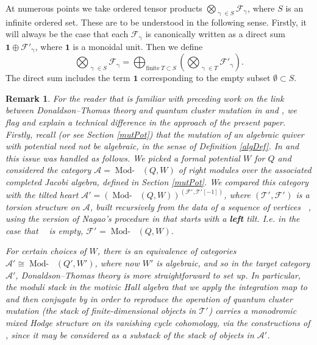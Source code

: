 \documentclass[a4paper,10pt]{amsart}
\newtheorem{remark}[theorem]{Remark}
\renewcommand{\gamma}{\upgamma}
\DeclareMathOperator{\Tmod}{Mod-}
\newcommand{\Rmod}[1]{\Tmod\!#1}
\DeclareMathOperator{\HJac}{\widehat{Jac}}
\DeclareMathOperator{\Ss}{\overline{s}}
\begin{document}
At numerous points we take ordered tensor products $\bigotimes_{\gamma\in S}\mathcal{F}_{\gamma}$, where $S$ is an infinite ordered set.  These are to be understood in the following sense.  Firstly, it will always be the case that each $\mathcal{F}_{\gamma}$ is canonically written as a direct sum $\mathbf{1}\oplus\mathcal{F}'_{\gamma}$, where $\mathbf{1}$ is a monoidal unit.  Then we define
\[
\bigotimes_{\gamma\in S}\mathcal{F}_{\gamma}=\bigoplus_{\textrm{finite}\;T\subset S}\left(\bigotimes_{\gamma\in T}\mathcal{F}'_{\gamma}\right).
\]
The direct sum includes the term $\mathbf{1}$ corresponding to the empty subset $\emptyset\subset S$.
\begin{remark}
\label{differenceRem}
For the reader that is familiar with preceding work on the link between Donaldson--Thomas theory and quantum cluster mutation in  \cite{Efi11} and \cite{DMSS13}, we flag and explain a technical difference in the approach of the present paper.  Firstly, recall (or see Section \ref{mutPot}) that the mutation of an algebraic quiver with potential need not be algebraic, in the sense of Definition \ref{algDef}.  In \cite{Efi11} and \cite{DMSS13} this issue was handled as follows.  We picked a formal potential $W$ for $Q$ and considered the category $\mathcal{A}=\Rmod{\HJac(Q,W)}$ of right modules over the associated completed Jacobi algebra, defined in Section \ref{mutPot}.  We compared this category with the tilted heart $\mathcal{A}'=(\Rmod{\HJac(Q,W)})^{(\mathcal{F}'_{\Ss},\mathcal{T}'_{\Ss}[-1])}$, where $(\mathcal{T}'_{\Ss},\mathcal{F}'_{\Ss})$ is a torsion structure on $\mathcal{A}$, built recursively from the data of a sequence of vertices $\Ss$, using the version of Nagao's procedure in \cite[Sec.3]{Na13} that starts with a \textbf{left} tilt.  I.e. in the case that $\Ss$ is empty, $\mathcal{F}'_{\Ss}=\Rmod{\HJac(Q,W)}$.

For certain choices of $W$, there is an equivalence of categories $\mathcal{A}'\cong \Rmod{\HJac(Q',W')}$, where now $W'$ is algebraic, and so in the target category $\mathcal{A}'$, Donaldson--Thomas theory is more straightforward to set up. In particular, the moduli stack in the motivic Hall algebra that we apply the integration map to and then conjugate by in order to reproduce the operation of quantum cluster mutation (the stack of finite-dimensional objects in $\mathcal{T}'_{\Ss}$) carries a monodromic mixed Hodge structure on its vanishing cycle cohomology, via the constructions of \cite{COHA}, since it may be considered as a substack of the stack of objects in $\mathcal{A}'$.  


\end{remark}
\end{document}
